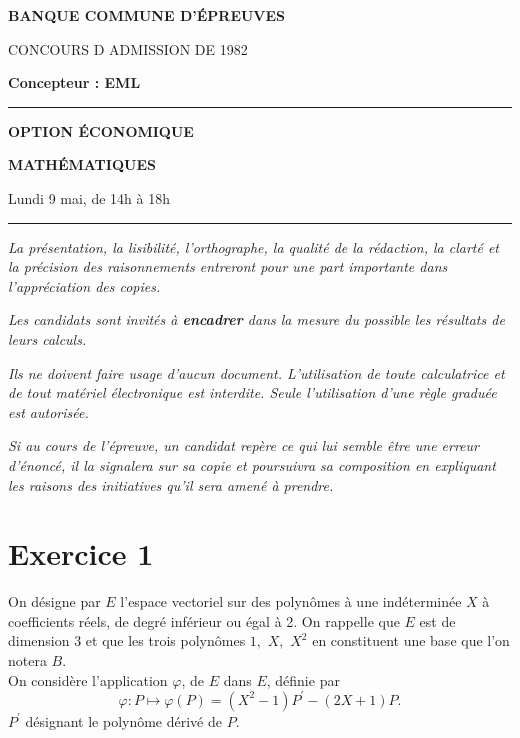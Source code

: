 \documentclass[11pt]{article}%
\begin{document}

\begin{center}
{\LARG\E\textbf{BANQUE COMMUNE D'ÉPREUVES}}



{\large \textsc{CONCOURS D ADMISSION DE 1982}}



{\large \textbf{Concepteur : EML}}



\rule{2.39cm}{0.05cm}



{\Large \textbf{OPTION ÉCONOMIQUE}}



{\Large \textbf{MATHÉMATIQUES }}



{\Large Lundi 9 mai, de 14h à 18h}



\rule{2.39cm}{0.05cm}
\end{center}

\textit{La présentation, la lisibilité, l'orthographe, la qualité
de la rédaction, la clarté et la précision des raisonnements
entreront pour une part importante dans l'appréciation des copies.}

\textit{Les candidats sont invités à \textbf{encadrer} dans la mesure
du possible les résultats de leurs calculs.}

\textit{Ils ne doivent faire usage d'aucun document. L'utilisation de
toute
calculatrice et de tout matériel électronique est interdite. Seule
l'utilisation d'une règle graduée est autorisée.}

\textit{Si au cours de l'épreuve, un candidat repère ce qui lui semble
être une erreur d'énoncé, il la signalera sur sa copie et
poursuivra sa composition en expliquant les raisons des initiatives
qu'il sera
amené à prendre.}

\vspace*{3cm}

\section*{Exercice 1}

On désigne par $E$ l'espace vectoriel sur des polynômes à une
indéterminée $X
$ à coefficients réels, de degré inférieur ou égal à 2. On rappelle que
$E$
est de dimension 3 et que les trois polynômes $1,$ $X,$ $X^{2}$ en
constituent une base que l'on notera $B$.\\
On considère l'application $\varphi $, de $E$ dans $E$, définie par 
\[
\varphi :P\mapsto \varphi (P) = (X^{2} - 1)P^{\prime } - (2X + 1)P.
\]
$P^{\prime }$ désignant le polynôme dérivé de $P$.
\end{document}

